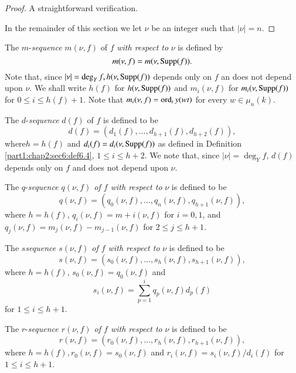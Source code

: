 \begin{proof}
A straightforward verification.

In the remainder of this section we let $\nu$ be an integer such that $|\nu|=n$.
\end{proof}

\begin{defi}\label{part1:chap2:sec6:def6.8}
  The $m$-{\em sequence} $m (\nu, f)$ of $f$ {\em with respect to} $\nu$ is defined by
$$
m (\nu, f) = m (\nu, \operatorname{Supp} (f)).
$$
Note that, since $|\nu|= \deg_Y f, h(\nu, \operatorname{Supp} (f))$ depends only on $f$ an does not depend upon $\nu$. We shall write $h(f)$ for $h (\nu, \operatorname{Supp} (f))$ and $m_i (\nu, f)$ for $m_i (\nu, \operatorname{Supp} (f))$ for $0 \leq i \leq h(f) +1$. Note that $m_i (\nu, f)= \operatorname{ord}_t y (wt)$ for every $w \in \mu_n (k)$.
\end{defi}

\begin{defi}\label{part1:chap2:sec6:def6.9}
  The $d$-{\em sequence} $d(f)$ of $f$ is defined to be
$$
d(f) = (d_1 (f), \ldots , d_{h+1} (f), d_{h+2}(f)),
$$
where\pageoriginale $h= h(f)$ and $d_i(f)= d_i (\nu, \operatorname{Supp} (f))$ as defined in Definition \ref{part1:chap2:sec6:def6.4}, $1 \leq i \leq h+2$. We note that, since $|\nu|=\deg_Y f$, $d(f)$ depends only on $f$ and does not depend upon $\nu$.
\end{defi}

\begin{defi}\label{part1:chap2:sec6:def6.10}
  The $q$-{\em sequence $q (\nu, f)$ of $f$ with respect to} $\nu$ is defined to be
$$
q (\nu, f) = (q_0 (\nu, f), \ldots , q_n (\nu, f), q_{h+1} (\nu, f)),
$$
where $h= h(f)$, $q_i (\nu, f)= m+i (\nu, f)$ for $i=0, 1$, and $q_j (\nu, f)= m_j (\nu, f)- m_{j-1} (\nu, f)$ for $2 \leq j \leq h+1$.
\end{defi}

\begin{defi}\label{part1:chap2:sec6:def6.11}
  The $s${\em sequence $s (\nu, f)$ of $f$ with respect to} $\nu$ is defined to be 
  $$
  s (\nu, f)= (s_0 (\nu, f), \ldots , s_h (\nu, f), s_{h+1} (\nu, f)),
  $$
where $h= h(f)$, $s_0 (\nu, f)= q_0(\nu, f)$ and 
$$
s_i (\nu, f)= \sum^i_{p=1} q_p (\nu, f) d_p (f)
$$
for $1 \leq i \leq h+1$.
\end{defi}

\begin{defi}\label{part1:chap2:sec6:def6.12}
  The $r$-{\em sequence $r(\nu, f)$ of $f$ with respect to} $\nu$ is defined to be 
$$
r (\nu, f) = (r_0 (\nu, f), \ldots, r_h (\nu, f), r_{h+1} (\nu, f)),
$$
where $h = h(f), r_0 (\nu, f)= s_0 (\nu, f)$ and $r_i (\nu, f)= s_i (\nu, f)/d_i (f)$ for $1 \leq i \leq h+1$.
\end{defi}

